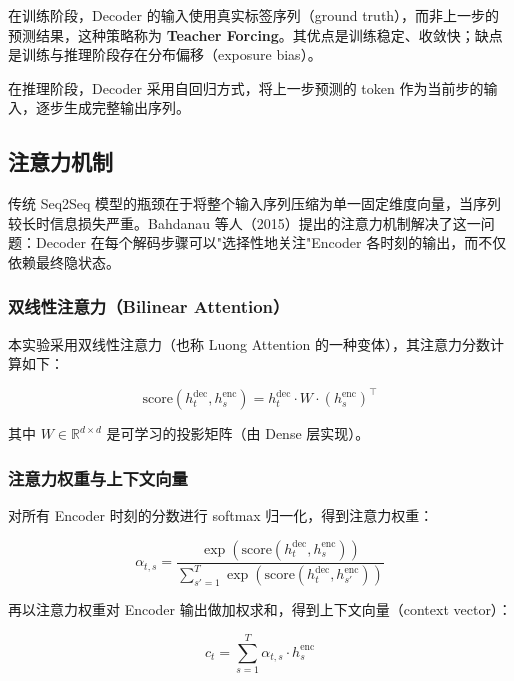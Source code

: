 \documentclass[12pt, a4paper]{article}
\begin{document}
在训练阶段，Decoder 的输入使用真实标签序列（ground truth），而非上一步的预测结果，这种策略称为 \textbf{Teacher Forcing}。其优点是训练稳定、收敛快；缺点是训练与推理阶段存在分布偏移（exposure bias）。

在推理阶段，Decoder 采用自回归方式，将上一步预测的 token 作为当前步的输入，逐步生成完整输出序列。

\subsection{注意力机制}

传统 Seq2Seq 模型的瓶颈在于将整个输入序列压缩为单一固定维度向量，当序列较长时信息损失严重。Bahdanau 等人（2015）提出的注意力机制解决了这一问题：Decoder 在每个解码步骤可以"选择性地关注"Encoder 各时刻的输出，而不仅依赖最终隐状态。

\subsubsection{双线性注意力（Bilinear Attention）}

本实验采用双线性注意力（也称 Luong Attention 的一种变体），其注意力分数计算如下：

\begin{equation}
    \text{score}(h_t^{\text{dec}}, h_s^{\text{enc}}) = h_t^{\text{dec}} \cdot W \cdot (h_s^{\text{enc}})^\top
\end{equation}

其中 $W \in \mathbb{R}^{d \times d}$ 是可学习的投影矩阵（由 Dense 层实现）。

\subsubsection{注意力权重与上下文向量}

对所有 Encoder 时刻的分数进行 softmax 归一化，得到注意力权重：

\begin{equation}
    \alpha_{t,s} = \frac{\exp(\text{score}(h_t^{\text{dec}}, h_s^{\text{enc}}))}{\sum_{s'=1}^{T} \exp(\text{score}(h_t^{\text{dec}}, h_{s'}^{\text{enc}}))}
\end{equation}

再以注意力权重对 Encoder 输出做加权求和，得到上下文向量（context vector）：

\begin{equation}
    c_t = \sum_{s=1}^{T} \alpha_{t,s} \cdot h_s^{\text{enc}}
\end{equation}
\end{document}
